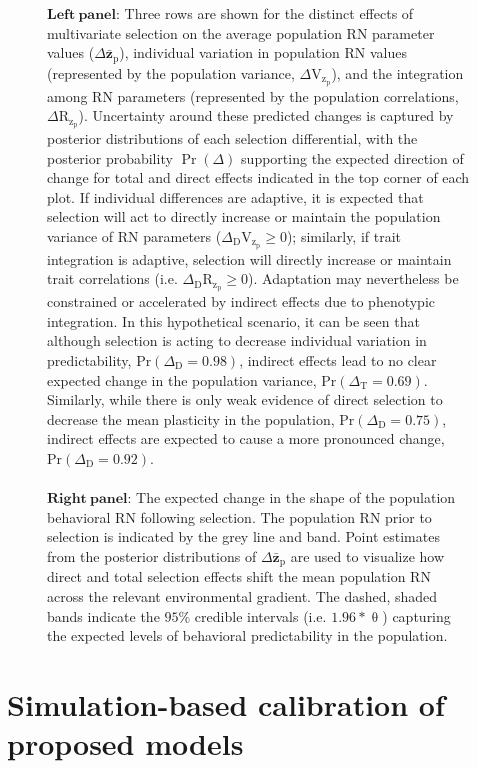 \documentclass{article}
\begin{document}
\begin{figure}
{$\boldsymbol{Left \ panel}$: Three rows are shown for the distinct effects of multivariate selection on the average population RN parameter values ($\Delta \boldsymbol{\bar{z}}_\mathrm{p}$), individual variation in population RN values (represented by the population variance, $\Delta \boldsymbol{\mathrm{V}}_\mathrm{z_p}$), and the integration among RN parameters (represented by the population correlations, $\Delta \boldsymbol{\mathrm{R}}_\mathrm{z_p}$). Uncertainty around these predicted changes is captured by posterior distributions of each selection differential, with the posterior probability $\Pr(\Delta)$ supporting the expected direction of change for total and direct effects indicated in the top corner of each plot. If individual differences are adaptive, it is expected that selection will act to directly increase or maintain the population variance of RN parameters ($\Delta_{\mathrm{D}} \boldsymbol{\mathrm{V}}_\mathrm{z_p} \geq 0$); similarly, if trait integration is adaptive, selection will directly increase or maintain trait correlations (i.e. $\Delta_{\mathrm{D}} \boldsymbol{\mathrm{R}}_\mathrm{z_p} \geq 0$). Adaptation may nevertheless be constrained or accelerated by indirect effects due to phenotypic integration. In this hypothetical scenario, it can be seen that although selection is acting to decrease individual variation in predictability, $\mathrm{Pr}(\Delta_{\mathrm{D}}=0.98 )$, indirect effects lead to no clear expected change in the population variance, $\mathrm{Pr}(\Delta_{\mathrm{T}}=0.69 )$. Similarly, while there is only weak evidence of direct selection to decrease the mean plasticity in the population, $\mathrm{Pr}(\Delta_{\mathrm{D}}=0.75 )$, indirect effects are expected to cause a more pronounced change, $\mathrm{Pr}(\Delta_{\mathrm{D}}=0.92 )$.    \\ \\
$\boldsymbol{Right \ panel}$: The expected change in the shape of the population behavioral RN following selection. The population RN prior to selection is indicated by the grey line and band. Point estimates from the posterior distributions of $\Delta \boldsymbol{\bar{z}}_\mathrm{p}$ are used to visualize how direct and total selection effects shift the mean population RN across the relevant environmental gradient. The dashed, shaded bands indicate the $95\%$ credible intervals (i.e. $1.96*\uptheta$) capturing the expected levels of behavioral predictability in the population.
}
\label{fig:fig3}
\end{figure}

\hypertarget{simulation-based-calibration-of-proposed-models}{%
\section{Simulation-based calibration of proposed
models}\label{simulation-based-calibration-of-proposed-models}}
\end{document}
